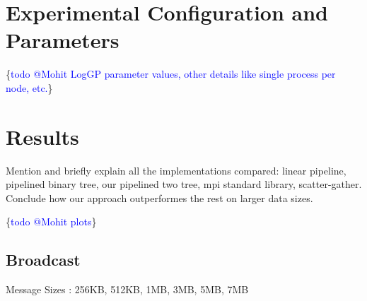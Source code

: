 \documentclass[sigplan,review,anonymous]{acmart}\settopmatter{printfolios=true,printccs=false,printacmref=false}
\begin{document}
\section{Experimental Configuration and Parameters}\label{sec:Config}


\ifcmts \{\textcolor{blue}{todo @Mohit LogGP parameter values, other details like single process per node, etc.}\}

\section{Results}\label{sec:Results}
Mention and briefly explain all the implementations compared: linear pipeline, pipelined binary tree, our pipelined two tree, mpi standard library, scatter-gather. Conclude how our approach outperformes the rest on larger data sizes.

\ifcmts \{\textcolor{blue}{todo @Mohit plots}\}

\subsection{Broadcast}

Message Sizes : 256KB, 512KB, 1MB, 3MB, 5MB, 7MB
\end{document}
